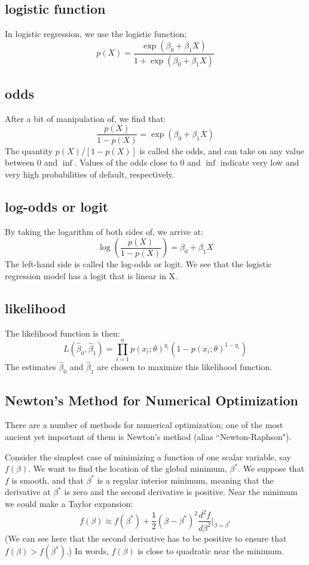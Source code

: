 \documentclass{article}
\begin{document}
\subsection{logistic function}
In logistic regression, we use the logistic function:
\[
p(X) = \frac{\exp ({\beta_0 + \beta_1 X})}{1 + \exp ({\beta_0 + \beta_1 X})}
\]

\subsection{odds}
After a bit of manipulation of, we find that:
\[
\frac{p(X)}{1 - p(X)} = \exp ({\beta_0 + \beta_1 X})
\]
The quantity $p(X)/[1−p(X)]$ is called the odds, and can take on any value
between $0$ and $\inf$. Values of the odds close to $0$ and $\inf$ indicate very low
and very high probabilities of default, respectively. 

\subsection{log-odds or logit}
By taking the logarithm of both sides of, we arrive at:
\[
\log \left( \frac{p(X)}{1 - p(X)} \right) = {\beta_0 + \beta_1 X}
\]
The left-hand side is called the log-odds or logit. We see that the logistic regression model has a logit that is linear in X.

\subsection{likelihood}
The likelihood function is then:
\[
L( {\hat{\beta}_0, \hat{\beta}_1} ) = \prod_{i=1}^{n} p(x_i;\theta)^{y_i} (1-p(x_i;\theta)^{1-y_i}) 
\]
The estimates $\hat{\beta}_0$ and $\hat{\beta}_1$ are chosen to maximize this likelihood function.

\subsection{Newton's Method for Numerical Optimization}
There are a number of methods for numerical optimization; one of the most ancient yet important of them is Newton's method (alias ``Newton-Raphson").

Consider the simplest case of minimizing a function of one scalar variable, say $f(\beta)$. We want to find the location of the global minimum, $\beta^*$. We suppose that $f$ is smooth, and that $\beta^*$ is a regular interior minimum, meaning that the derivative at $\beta^*$ is zero and the second derivative is positive. Near the minimum we could make a Taylor expansion:
\[
f(\beta) \approx f(\beta^*) + \frac{1}{2} (\beta - \beta^*)^2 \frac{d^2f}{d\beta^2} \Bigr|_{\beta = \beta^*}
\]
(We can see here that the second derivative has to be positive to ensure that $f(\beta)>f(\beta^*)$.) In words, $f(\beta)$ is close to quadratic near the minimum.
\end{document}

